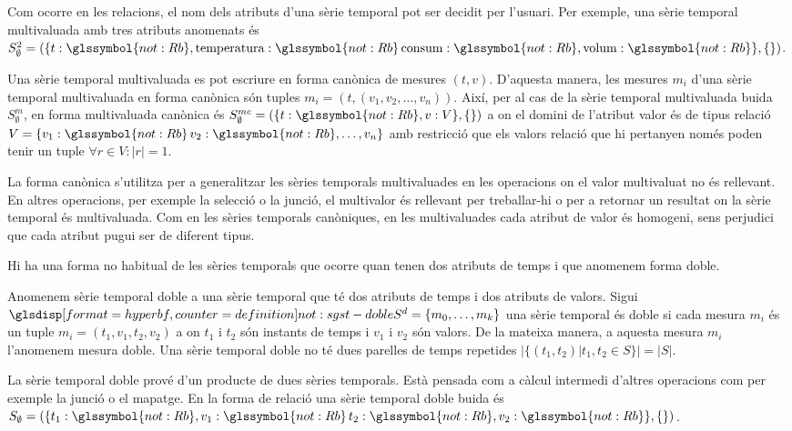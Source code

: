 Com ocorre en les relacions, el nom dels atributs d'una sèrie temporal
pot ser decidit per l'usuari. Per exemple, una sèrie temporal
multivaluada amb tres atributs anomenats és $S^2_{\emptyset} = ( \{t:
\glssymbol{not:Rb}, \text{temperatura}: \glssymbol{not:Rb}\, \text{consum}:
\glssymbol{not:Rb}, \text{volum}: \glssymbol{not:Rb}\}, \{ \} )$.



Una sèrie temporal multivaluada es pot escriure en forma canònica de
mesures $(t,v)$. D'aquesta manera, les mesures $m_i$
d'una sèrie temporal multivaluada en forma canònica són tuples
$m_i=(t,(v_1,v_2,\dotsc,v_n))$.  Així, per al cas de la sèrie temporal
multivaluada buida $S^m_{\emptyset}$, en forma multivaluada canònica és
$S^{mc}_{\emptyset} = ( \{t: \glssymbol{not:Rb}, v: V \}, \{ \} )$ a on el
domini de l'atribut valor és de tipus relació $V = \{ v_1:
\glssymbol{not:Rb}\, v_2: \glssymbol{not:Rb}, \dotsc, v_n \}$ amb restricció que els
valors relació que hi pertanyen només poden tenir un tuple $\forall r
\in V: |r| = 1$.


La forma canònica s'utilitza per a
generalitzar les sèries temporals multivaluades en les operacions on
el valor multivaluat no és rellevant. En altres operacions, per
exemple la selecció o la junció, el multivalor és rellevant per
treballar-hi o per a retornar un resultat on la sèrie temporal és
multivaluada. Com en les sèries temporals canòniques, en les
multivaluades cada atribut de valor és homogeni, sens perjudici que
cada atribut pugui ser de diferent tipus.

  



Hi ha una forma no habitual de les sèries temporals que ocorre quan
tenen dos atributs de temps i que anomenem forma doble.

\begin{definition}
  \label{def:sgst:st-doble}
  Anomenem sèrie temporal doble a una sèrie temporal que té dos
  atributs de temps i dos atributs de valors. Sigui
  $\glsdispdef{not:sgst-doble}{S^d =\{m_0, \dotsc, m_k\}}$ una sèrie
  temporal és doble si cada mesura $m_i$ és un tuple
  $m_i=(t_1,v_1,t_2,v_2)$ a on $t_1$ i $t_2$ són instants de temps i
  $v_1$ i $v_2$ són valors. De la mateixa manera, a aquesta mesura
  $m_i$ l'anomenem mesura doble.  Una sèrie temporal doble no té dues
  parelles de temps repetides $|\{(t_1,t_2) | t_1,t_2\in S\}| = |S|$.
\end{definition}

La sèrie temporal doble prové d'un producte de dues sèries
temporals. Està pensada com a càlcul intermedi d'altres operacions com
per exemple la junció o el mapatge. En la forma de relació una sèrie
temporal doble buida és $S_{\emptyset} = ( \{t_1: \glssymbol{not:Rb}, v_1:
\glssymbol{not:Rb}\, t_2: \glssymbol{not:Rb}, v_2: \glssymbol{not:Rb}\}, \{ \} )$.









